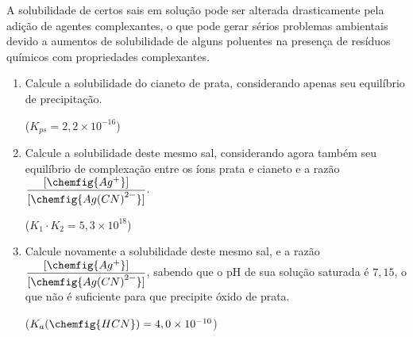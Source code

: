 A solubilidade de certos sais em solução pode ser alterada drasticamente pela
adição de agentes complexantes, o que pode gerar sérios problemas ambientais
devido a aumentos de solubilidade de alguns poluentes na presença de resíduos
químicos com propriedades complexantes.

\begin{enumerate}[label = (\alph*)]
	\item Calcule a solubilidade do cianeto de prata, considerando apenas seu equilíbrio de precipitação.
		
		($K_{ps} = 2,2 \times 10^{-16}$)
	
	\item Calcule a solubilidade deste mesmo sal, considerando agora também seu equilíbrio de complexação entre os íons prata e cianeto e a razão $\dfrac{[\chemfig{Ag^+}]}{[\chemfig{Ag{(CN)}^{2-}}]}$.
		
		($K_1 \cdot K_2 = 5,3 \times 10^{18}$)

	\item Calcule novamente a solubilidade deste mesmo sal, e a razão $\dfrac{[\chemfig{Ag^+}]}{[\chemfig{Ag{(CN)}^{2-}}]}$, sabendo que o pH de sua solução saturada é $7,15$, o que não é suficiente para que precipite óxido de prata.
		
		($K_a(\chemfig{HCN}) = 4,0 \times 10^{-10}$)

\end{enumerate}
